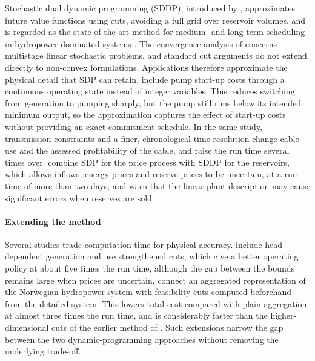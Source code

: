 Stochastic dual dynamic programming (SDDP), introduced by
\citet{pereira1991}, approximates future value functions using cuts,
avoiding a full grid over reservoir volumes, and is regarded as the
state-of-the-art method for medium- and long-term scheduling in
hydropower-dominated systems \citep{helseth2016}. The convergence
analysis of \citet{shapiro2011} concerns multistage linear stochastic
problems, and standard cut arguments do not extend directly to
non-convex formulations. Applications therefore approximate the physical
detail that SDP can retain. \citet{helseth2013} include pump start-up
costs through a continuous operating state instead of integer
variables. This reduces switching from generation to pumping sharply,
but the pump still runs below its intended minimum output, so the
approximation captures the effect of start-up costs without providing an
exact commitment schedule. In the same study, transmission constraints
and a finer, chronological time resolution change cable use and the
assessed profitability of the cable, and raise the run time several
times over. \citet{helseth2016} combine SDP for the price
process with SDDP for the reservoirs, which allows inflows, energy prices
and reserve prices to be uncertain, at a run time of more than two days,
and warn that the linear plant description may cause significant errors
when reserves are sold.

\paragraph{Extending the method}
Several studies trade computation time for physical accuracy.
\citet{hjelmeland2019energies} include head-dependent generation and use
strengthened cuts, which give a better operating policy at about five
times the run time, although the gap between the bounds remains large
when prices are uncertain. \citet{helseth2024approximating} connect an
aggregated representation of the Norwegian hydropower system with
feasibility cuts computed beforehand from the detailed system. This
lowers total cost compared with plain aggregation at almost three times
the run time, and is considerably faster than the higher-dimensional
cuts of the earlier method of \citet{helseth2023hydropowera}. Such
extensions narrow the gap between the two dynamic-programming approaches
without removing the underlying trade-off.

